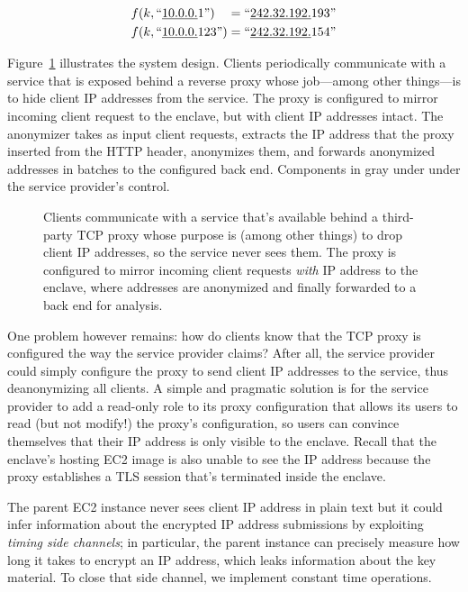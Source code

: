 \begin{align}
f(k, \textrm{``\underline{10.0.0.}1''})\phantom{23} = \textrm{``\underline{242.32.192.}193''} \\
f(k, \textrm{``\underline{10.0.0.}123''}) = \textrm{``\underline{242.32.192.}154''}
\end{align}

Figure~\ref{fig:address-anonymizer} illustrates the system design.  Clients periodically communicate with a service that is exposed behind a reverse proxy whose job---among other things---is to hide client IP addresses from the service.  The proxy is configured to mirror incoming client request to the enclave, but with client IP addresses intact.  The anonymizer takes as input client requests, extracts the IP address that the proxy inserted from the HTTP header, anonymizes them, and forwards anonymized addresses in batches to the configured back end.  Components in gray under under the service provider's control.

\begin{figure}[t]
\centering

\caption{Clients communicate with a service that's available behind a third-party TCP proxy whose purpose is (among other things) to drop client IP addresses, so the service never sees them.  The proxy is configured to mirror incoming client requests \emph{with} IP address to the enclave, where addresses are anonymized and finally forwarded to a back end for analysis.}
\label{fig:address-anonymizer}
\end{figure}

One problem however remains: how do clients know that the TCP proxy is configured the way the service provider claims?  After all, the service provider could simply configure the proxy to send client IP addresses to the service, thus deanonymizing all clients.  A simple and pragmatic solution is for the service provider to add a read-only role to its proxy configuration that allows its users to read (but not modify!) the proxy's configuration, so users can convince themselves that their IP address is only visible to the enclave.  Recall that the enclave's hosting EC2 image is also unable to see the IP address because the proxy establishes a TLS session that's terminated inside the enclave.


The parent EC2 instance never sees client IP address in plain text but it could infer information about the encrypted IP address submissions by exploiting \emph{timing side channels}; in particular, the parent instance can precisely measure how long it takes to encrypt an IP address, which leaks information about the key material.  To close that side channel, we implement constant time operations.

